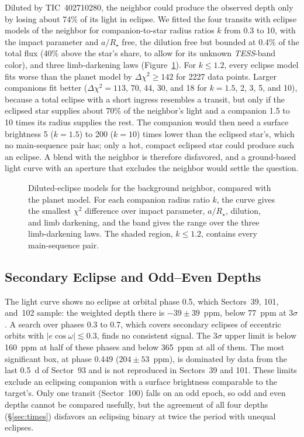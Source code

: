 \documentclass[twocolumn,linenumbers]{aastex701}
\newcommand{\tic}{TIC~402710280}
\newcommand{\tess}{\textit{TESS}}
\begin{document}
Diluted by \tic, the neighbor could produce the observed depth only by losing about 74\% of its light in eclipse. We fitted the four transits with eclipse models of the neighbor for companion-to-star radius ratios $k$ from 0.3 to 10, with the impact parameter and $a/R_\star$ free, the dilution free but bounded at 0.4\% of the total flux (40\% above the star's share, to allow for its unknown \tess-band color), and three limb-darkening laws (Figure~\ref{fig:blend}). For $k \leq 1.2$, every eclipse model fits worse than the planet model by $\Delta\chi^2 \geq 142$ for 2227 data points. Larger companions fit better ($\Delta\chi^2 = 113$, 70, 44, 30, and 18 for $k = 1.5$, 2, 3, 5, and 10), because a total eclipse with a short ingress resembles a transit, but only if the eclipsed star supplies about 70\% of the neighbor's light and a companion 1.5 to 10 times its radius supplies the rest. The companion would then need a surface brightness 5 ($k = 1.5$) to 200 ($k = 10$) times lower than the eclipsed star's, which no main-sequence pair has; only a hot, compact eclipsed star could produce such an eclipse. A blend with the neighbor is therefore disfavored, and a ground-based light curve with an aperture that excludes the neighbor would settle the question.

\begin{figure}
\caption{Diluted-eclipse models for the background neighbor, compared with the planet model. For each companion radius ratio $k$, the curve gives the smallest $\chi^2$ difference over impact parameter, $a/R_\star$, dilution, and limb darkening, and the band gives the range over the three limb-darkening laws. The shaded region, $k \leq 1.2$, contains every main-sequence pair.\label{fig:blend}}
\end{figure}

\subsection{Secondary Eclipse and Odd--Even Depths} \label{sec:secondary}

The light curve shows no eclipse at orbital phase 0.5, which Sectors~39, 101, and~102 sample: the weighted depth there is $-39 \pm 39$~ppm, below 77~ppm at $3\sigma$. A search over phases 0.3 to 0.7, which covers secondary eclipses of eccentric orbits with $|e\cos\omega| \lesssim 0.3$, finds no consistent signal. The $3\sigma$ upper limit is below 160~ppm at half of these phases and below 365~ppm at all of them. The most significant box, at phase 0.449 ($204 \pm 53$~ppm), is dominated by data from the last 0.5~d of Sector~93 and is not reproduced in Sectors~39 and 101. These limits exclude an eclipsing companion with a surface brightness comparable to the target's. Only one transit (Sector~100) falls on an odd epoch, so odd and even depths cannot be compared usefully, but the agreement of all four depths (\S\ref{sec:times}) disfavors an eclipsing binary at twice the period with unequal eclipses.
\end{document}
